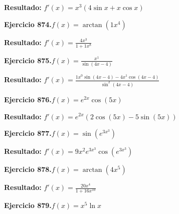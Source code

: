 \documentclass[10pt,a4paper]{article}
\begin{document}
\begin{solbox}
\textbf{Resultado:} \(\displaystyle f'(x) = x^{3}(4\sin x + x\cos x)\)
\end{solbox}

\newpage
\begin{ejbox}
\textbf{Ejercicio 874.}\quad $f(x) = \arctan(1x^{4})$
\end{ejbox}

\begin{solbox}
\textbf{Resultado:} \(\displaystyle f'(x) = \frac{4x^{3}}{1+1x^{8}}\)
\end{solbox}

\begin{ejbox}
\textbf{Ejercicio 875.}\quad $f(x) = \frac{x^{1}}{\sin(4x -4)}$
\end{ejbox}

\begin{solbox}
\textbf{Resultado:} \(\displaystyle f'(x) = \frac{1x^{0}\sin(4x -4) - 4x^{1}\cos(4x -4)}{\sin^2(4x -4)}\)
\end{solbox}

\begin{ejbox}
\textbf{Ejercicio 876.}\quad $f(x) = e^{2x} \cos(5x)$
\end{ejbox}

\begin{solbox}
\textbf{Resultado:} \(\displaystyle f'(x) = e^{2x}(2\cos(5x) - 5\sin(5x))\)
\end{solbox}

\newpage
\begin{ejbox}
\textbf{Ejercicio 877.}\quad $f(x) = \sin(e^{3x^{3}})$
\end{ejbox}

\begin{solbox}
\textbf{Resultado:} \(\displaystyle f'(x) = 9x^{2}e^{3x^{3}}\cos(e^{3x^{3}})\)
\end{solbox}

\begin{ejbox}
\textbf{Ejercicio 878.}\quad $f(x) = \arctan(4x^{5})$
\end{ejbox}

\begin{solbox}
\textbf{Resultado:} \(\displaystyle f'(x) = \frac{20x^{4}}{1+16x^{10}}\)
\end{solbox}

\begin{ejbox}
\textbf{Ejercicio 879.}\quad $f(x) = x^{5} \ln x$
\end{ejbox}
\end{document}
